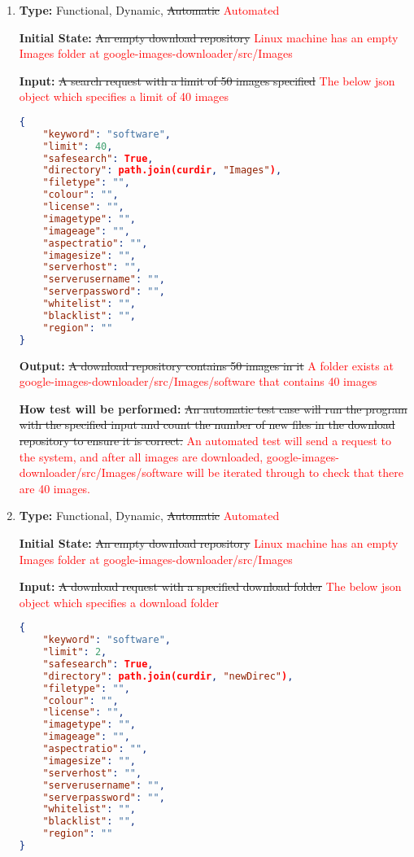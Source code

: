 \documentclass[12pt, titlepage]{article}
\begin{document}
\begin{enumerate}[label=FR-DL\arabic*:, wide=0pt, leftmargin=*]

\item \phantom{empty}

\textbf{Type:} Functional, Dynamic, \sout{Automatic} \textcolor{red}{Automated}

\textbf{Initial State:} \sout{An empty download repository}
\textcolor{red}{Linux machine has an empty Images folder at google-images-downloader/src/Images}

\textbf{Input:} \sout{A search request with a limit of 50 images specified}
\textcolor{red}{The below json object which specifies a limit of 40 images}
\begin{lstlisting}[language=json,firstnumber=1]
{
    "keyword": "software",
    "limit": 40,
    "safesearch": True,
    "directory": path.join(curdir, "Images"),
    "filetype": "",
    "colour": "",
    "license": "",
    "imagetype": "",
    "imageage": "",
    "aspectratio": "",
    "imagesize": "",
    "serverhost": "",
    "serverusername": "",
    "serverpassword": "",
    "whitelist": "",
    "blacklist": "",
    "region": ""
}
\end{lstlisting}

\textbf{Output:} \sout{A download repository contains 50 images in it}
\textcolor{red}{A folder exists at google-images-downloader/src/Images/software that contains 40 images}

\textbf{How test will be performed:} \sout{An automatic test case will run the program with the specified input 
and count the number of new files in the download repository to ensure it is correct.}
\textcolor{red}{An automated test will send a request to the system, and after all images are downloaded, 
google-images-downloader/src/Images/software will be iterated through to check that there are 40 images.}

\item \phantom{empty}

\textbf{Type:} Functional, Dynamic, \sout{Automatic} \textcolor{red}{Automated}
					
\textbf{Initial State:} \sout{An empty download repository}
\textcolor{red}{Linux machine has an empty Images folder at google-images-downloader/src/Images}
					
\textbf{Input:} \sout{A download request with a specified download folder}
\textcolor{red}{The below json object which specifies a download folder}
\begin{lstlisting}[language=json,firstnumber=1]
{
    "keyword": "software",
	"limit": 2,
	"safesearch": True,
	"directory": path.join(curdir, "newDirec"),
	"filetype": "",
	"colour": "",
	"license": "",
	"imagetype": "",
	"imageage": "",
	"aspectratio": "",
	"imagesize": "",
	"serverhost": "",
	"serverusername": "",
	"serverpassword": "",
	"whitelist": "",
    "blacklist": "",
	"region": ""
}
\end{lstlisting}
					

\end{enumerate}
\end{document}
